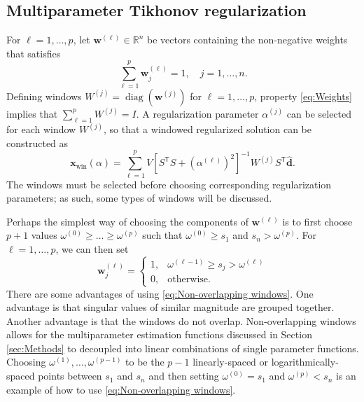 \documentclass[12pt]{article}
\newcommand{\dVec}{\mathbf{d}}	%
\newcommand{\xVec}{\mathbf{x}}	%
\newcommand{\wVec}{\mathbf{w}}	%
\newcommand{\trans}[1]{{#1}^\mathsf{T}}	%
\newcommand{\inv}[1]{{#1}^{-1}}	%
\DeclareMathOperator{\diag}{diag}	%
\newcommand{\dft}[1]{\widehat{#1}}	%
\newcommand{\regparam}{\alpha}  %
\newcommand{\xWin}{\xVec_{\text{win}}(\regparam)}	%
\newcommand{\singular}{s}	%
\begin{document}
\subsection{Multiparameter Tikhonov regularization} \label{sec:Multiparameter}
For $\ell = 1,\ldots,p$, let $\wVec^{(\ell)} \in \mathbb{R}^n$ be vectors containing the non-negative weights that satisfies
\begin{equation}
\label{eq:Weights}
\sum_{\ell=1}^{p} \wVec_j^{(\ell)} = 1, \quad j = 1,\ldots,n.
\end{equation}
Defining windows $W^{(j)} = \diag(\wVec^{(j)})$ for $\ell = 1,\ldots,p$, property \eqref{eq:Weights} implies that $\sum_{\ell=1}^p W^{(j)} = I$.  A regularization parameter $\regparam^{(j)}$ can be selected for each window $W^{(j)}$, so that a windowed regularized solution can be constructed as
\begin{equation}
\label{eq:TikSolWindow}
\xWin = \sum_{\ell=1}^p V\inv{\left[\trans{S}S + (\regparam^{(\ell)})^2\right]}W^{(j)}\trans{S}\dft{\dVec}.
\end{equation}
The windows must be selected before choosing corresponding regularization parameters; as such, some types of windows will be discussed. \par
Perhaps the simplest way of choosing the components of $\wVec^{(\ell)}$ is to first choose $p+1$ values $\omega^{(0)} \geq \ldots \geq \omega^{(p)}$ such that $\omega^{(0)} \geq \singular_1$ and $\singular_n > \omega^{(p)}$. For $\ell = 1,\ldots,p$, we can then set
\begin{equation}
\label{eq:Non-overlapping windows}
\wVec_j^{(\ell)} = \begin{cases}
1, & \omega^{(\ell-1)} \geq \singular_j > \omega^{(\ell)} \\
0, & \text{otherwise.}
\end{cases}
\end{equation}
There are some advantages of using \eqref{eq:Non-overlapping windows}. One advantage is that singular values of similar magnitude are grouped together. Another advantage is that the windows do not overlap. Non-overlapping windows allows for the multiparameter estimation functions discussed in Section \ref{sec:Methods} to decoupled into linear combinations of single parameter functions. Choosing $\omega^{(1)},\ldots,\omega^{(p-1)}$ to be the $p-1$ linearly-spaced or logarithmically-spaced points between $\singular_1$ and $\singular_n$ and then setting $\omega^{(0)} = \singular_1$ and $\omega^{(p)} < \singular_n$ is an example of how to use \eqref{eq:Non-overlapping windows}.
\end{document}
